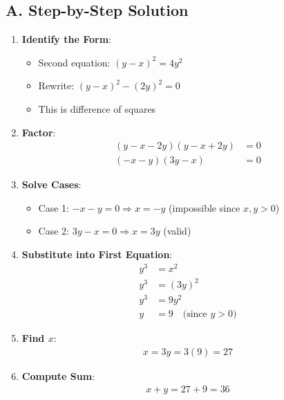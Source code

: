 \documentclass[12pt]{article}
\begin{document}
\begin{solutionbox}
\subsection*{A. Step-by-Step Solution}
\begin{enumerate}[leftmargin=*]
    \item \textbf{Identify the Form}: 
    \begin{itemize}
        \item Second equation: $(y-x)^2 = 4y^2$
        \item Rewrite: $(y-x)^2 - (2y)^2 = 0$
        \item This is difference of squares
    \end{itemize}
    
    \item \textbf{Factor}: 
    \begin{align*}
    (y-x-2y)(y-x+2y) &= 0\\
    (-x-y)(3y-x) &= 0
    \end{align*}
    
    \item \textbf{Solve Cases}: 
    \begin{itemize}
        \item Case 1: $-x-y = 0 \Rightarrow x = -y$ (impossible since $x, y > 0$)
        \item Case 2: $3y - x = 0 \Rightarrow x = 3y$ (valid)
    \end{itemize}
    
    \item \textbf{Substitute into First Equation}: 
    \begin{align*}
    y^3 &= x^2\\
    y^3 &= (3y)^2\\
    y^3 &= 9y^2\\
    y &= 9 \quad \text{(since } y > 0)
    \end{align*}
    
    \item \textbf{Find $x$}: 
    \begin{align*}
    x = 3y = 3(9) = 27
    \end{align*}
    
    \item \textbf{Compute Sum}: 
    \begin{align*}
    x + y = 27 + 9 = 36
    \end{align*}
\end{enumerate}


\end{solutionbox}
\end{document}
